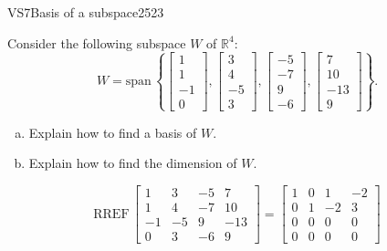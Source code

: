 \begin{exercise}{VS7}{Basis of a subspace}{2523} 
\begin{exerciseStatement} 

 Consider the following subspace \(W\) of \(\mathbb R^4\): \[W=\mathrm{span}\,\left\{ \left[\begin{array}{c}
1 \\
1 \\
-1 \\
0
\end{array}\right] , \left[\begin{array}{c}
3 \\
4 \\
-5 \\
3
\end{array}\right] , \left[\begin{array}{c}
-5 \\
-7 \\
9 \\
-6
\end{array}\right] , \left[\begin{array}{c}
7 \\
10 \\
-13 \\
9
\end{array}\right] \right\}.\] 

 

\begin{enumerate}[(a)]
\item 

Explain how to find a basis of \(W\).


\item 

Explain how to find the dimension of \(W\).


\end{enumerate}

     \end{exerciseStatement}
 \begin{exerciseAnswer} 

\[\mathrm{RREF}\,\left[\begin{array}{cccc}
1 & 3 & -5 & 7 \\
1 & 4 & -7 & 10 \\
-1 & -5 & 9 & -13 \\
0 & 3 & -6 & 9
\end{array}\right]=\left[\begin{array}{cccc}
1 & 0 & 1 & -2 \\
0 & 1 & -2 & 3 \\
0 & 0 & 0 & 0 \\
0 & 0 & 0 & 0
\end{array}\right]\]


\end{exerciseAnswer}
\end{exercise}
